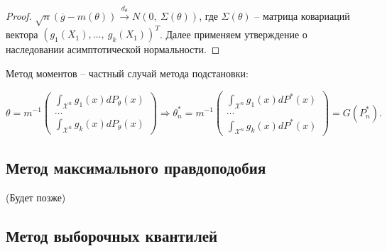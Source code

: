 \begin{proof}
    $\displaystyle \sqrt{n}(\overline{g} -m( \theta ))\xrightarrow{d_{\theta }} N( 0,\ \Sigma ( \theta ))$, где $\displaystyle \Sigma ( \theta )$ -- матрица ковариаций вектора $\displaystyle ( g_{1}( X_{1}) ,\dotsc ,\ g_{k}( X_{1}))^{T}$. Далее применяем утверждение о наследовании асимптотической нормальности.
\end{proof}
\begin{note}
Метод моментов -- частный случай метода подстановки:


\begin{equation*}
\theta =m^{-1}\begin{pmatrix}
\int _{\mathcal{X}^{n}} g_{1}( x) dP_{\theta }( x)\\
\dotsc \\
\int _{\mathcal{X}^{n}} g_{k}( x) dP_{\theta }( x)
\end{pmatrix} \Rightarrow \theta _{n}^{*} =m^{-1}\begin{pmatrix}
\int _{\mathcal{X}^{n}} g_{1}( x) dP^{*}( x)\\
\dotsc \\
\int _{\mathcal{X}^{n}} g_{k}( x) dP^{*}( x)
\end{pmatrix} =G\left( P_{n}^{*}\right) .
\end{equation*}
\end{note}
\subsection{Метод максимального правдоподобия}

(Будет позже)
\subsection{Метод выборочных квантилей}

